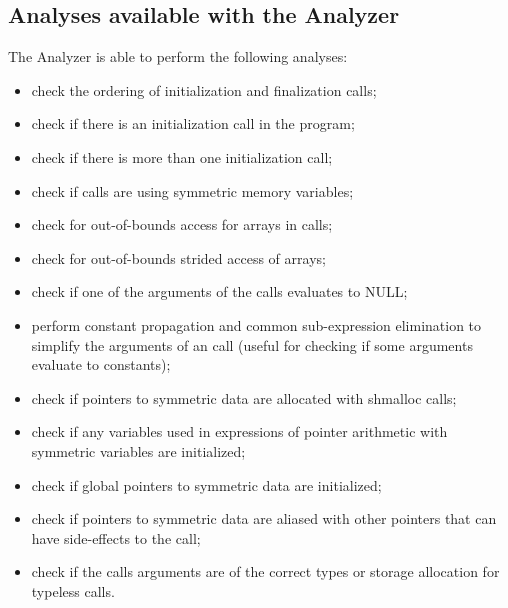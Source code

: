 \begin{minipage}{\linewidth}

  \subsection{Analyses available with the \openshmem Analyzer}

  The \openshmem Analyzer is able to perform the following analyses:

  \vspace{0.1in}

  \begin{itemize}
  \item check the ordering of \openshmem initialization and
    finalization calls;
  \item check if there is an \openshmem initialization call in the
    program;
  \item check if there is more than one \openshmem initialization
    call;
  \item check if \openshmem calls are using symmetric memory variables;
  \item check for out-of-bounds access for arrays in \openshmem calls;
  \item check for out-of-bounds strided access of arrays;
  \item check if one of the arguments of the \openshmem calls
    evaluates to NULL;
  \item perform constant propagation and common sub-expression
    elimination to simplify the arguments of an \openshmem call
    (useful for checking if some arguments evaluate to constants);
  \item check if pointers to symmetric data are allocated with
    shmalloc calls;
  \item check if any variables used in expressions of pointer
    arithmetic with symmetric variables are initialized;
  \item check if global pointers to symmetric data are initialized;
  \item check if pointers to symmetric data are aliased with other
    pointers that can have side-effects to the \openshmem call;
  \item check if the \openshmem calls arguments are of the correct
    types or storage allocation for \openshmem typeless calls.

  \end{itemize}

\end{minipage}

